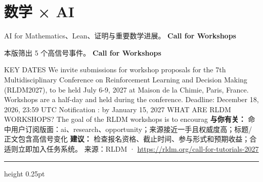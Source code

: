 \documentclass[10.5pt]{ctexart}
\begin{document}
\section*{数学 × AI}
{\color{ormuted} AI for Mathematics、Lean、证明与重要数学进展。}
\vspace{2mm}
{\LARGE\bfseries Call for Workshops}\par
\vspace{1mm}
{\color{ormuted} 本版筛出 5 个高信号事件。}
\vspace{3mm}
{\Large\bfseries Call for Workshops}\par
KEY DATES We invite submissions for workshop proposals for the 7th Multidisciplinary Conference on Reinforcement Learning and Decision Making (RLDM2027), to be held July 6-9, 2027 at Maison de la Chimie, Paris, France. Workshops are a half-day and held during the conference. Deadline: December 18, 2026, 23:59 UTC Notification : by January 15, 2027 WHAT ARE RLDM WORKSHOPS? The goal of the RLDM workshops is to encourag
\textbf{与你有关：} 命中用户订阅版面：ai、research、opportunity；来源接近一手且权威度高；标题/正文包含高信号变化
\textbf{建议：} 检查报名资格、截止时间、参与形式和预期收益；合适则立即加入任务系统。
{\footnotesize\color{ormuted} 来源：RLDM · \url{https://rldm.org/call-for-tutorials-2027}}
\vspace{4mm}
\hrule height 0.25pt
\vspace{3mm}
\end{document}
